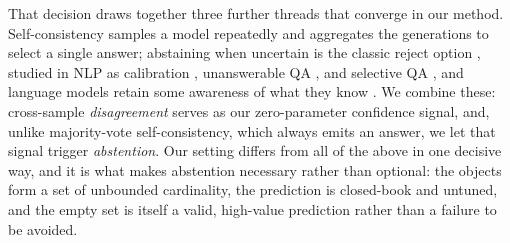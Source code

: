 That decision draws together three further threads that converge in our method.
Self-consistency \citep{wang2022selfconsistency,chen2023universalsc} samples a
model repeatedly and aggregates the generations to select a single answer;
abstaining when uncertain is the classic reject option
\citep{geifman2017selective}, studied in NLP as calibration
\citep{guo2017calibration}, unanswerable QA \citep{rajpurkar2018squad2}, and
selective QA \citep{cole2023selective}, and language models retain some awareness
of what they know \citep{kadavath2022know}. We combine these: cross-sample
\emph{disagreement} \citep{kuhn2023semantic,manakul2023selfcheckgpt} serves as our
zero-parameter confidence signal, and, unlike majority-vote self-consistency,
which always emits an answer, we let that signal trigger \emph{abstention}. Our
setting differs from all of the above in one decisive way, and it is what makes
abstention necessary rather than optional: the objects form a set of unbounded
cardinality, the prediction is closed-book and untuned, and the empty set is
itself a valid, high-value prediction rather than a failure to be avoided.
